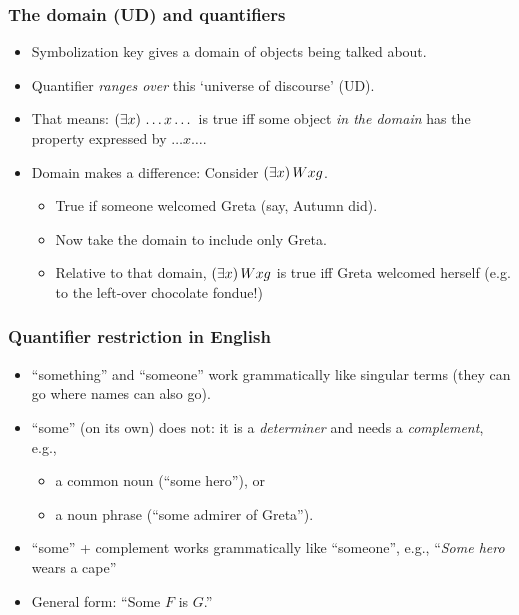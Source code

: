 \begin{frame}
\frametitle{The domain (UD) and quantifiers}

\begin{itemize}[<+->]
  \item Symbolization key gives a domain of objects being talked about.
  \item Quantifier \emph{ranges over} this `universe of discourse' (UD).
  \item That means: $(\exists x)\, \dots x \dots$ is true iff some object
  \emph{in the domain} has the property expressed by $\dots x \dots$.
  \item Domain makes a difference: Consider $(\exists x)\, Wxg$.
  \begin{itemize}
    \item True if someone welcomed Greta (say, Autumn did).
    \item Now take the domain to include only Greta.
    \item Relative to that domain, $(\exists x)\, Wxg$ is true iff
    Greta welcomed herself (e.g. to the left-over chocolate fondue!) 
  \end{itemize}
\end{itemize}
\end{frame}

\begin{frame}
\frametitle{Quantifier restriction in English}

\begin{itemize}[<+->]
  \item ``something'' and ``someone'' work grammatically like singular
  terms (they can go where names can also go).
  \item ``some'' (on its own) does not: it is a \emph{determiner} and
  needs a \emph{complement}, e.g.,
    \medskip
  \begin{itemize}
    \item a common noun (``some hero''), or
    \item a noun phrase (``some admirer of Greta'').
  \end{itemize}
  
  \medskip
  \item ``some'' + complement works grammatically like ``someone'',
  e.g., ``\emph{Some hero} wears a cape''
  \item General form: ``Some $F$ is $G$.''
\end{itemize}
\end{frame}

